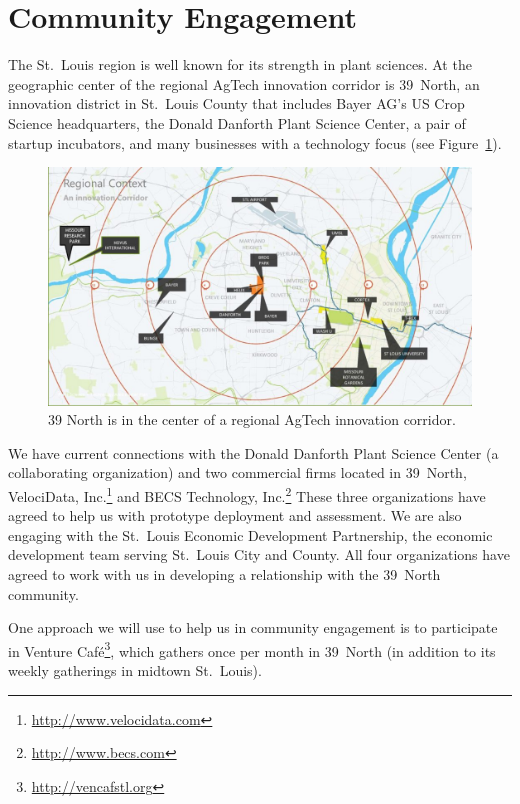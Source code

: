 \section{Community Engagement}
\label{sec:community}

The St.~Louis region is well known for its strength in plant sciences.
At the geographic center of the regional AgTech innovation corridor is
39~North, an innovation district in St.~Louis County that includes Bayer AG's
US Crop Science headquarters, the Donald Danforth Plant Science Center,
a pair of startup incubators, and many businesses with a technology focus
(see Figure~\ref{fig:39N}).

\begin{figure}[ht]
\centering
\includegraphics[width=0.75\linewidth]{figures/39N}
\caption{39 North is in the center of a regional AgTech innovation corridor.}
\label{fig:39N}
\end{figure}

We have current connections with the Donald Danforth Plant Science
Center (a collaborating organization) and two commercial firms
located in 39~North,
VelociData, Inc.\footnote{\url{http://www.velocidata.com}} and
BECS Technology, Inc.\footnote{\url{http://www.becs.com}}
These three organizations have agreed to help us with prototype deployment
and assessment.
We are also engaging with the St.~Louis Economic Development Partnership,
the economic development team serving St.~Louis City and County.
All four organizations have agreed to work with us in
developing a relationship with the 39~North community.

One approach we will use to help us in community engagement is to participate
in Venture Caf\'e\footnote{\url{http://vencafstl.org}}, which gathers once per
month in 39~North (in addition to its weekly gatherings in midtown St.~Louis).
